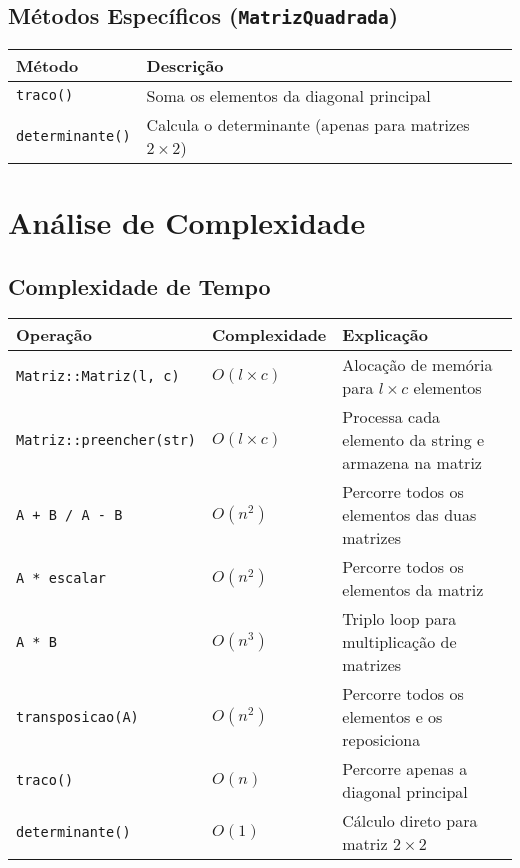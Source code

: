 \documentclass{article}
\begin{document}
\subsection{Métodos Específicos (\texttt{MatrizQuadrada})}
\begin{tabular}{|l|p{10cm}|}
\hline
\textbf{Método} & \textbf{Descrição} \\
\hline
\texttt{traco()} & Soma os elementos da diagonal principal \\
\hline
\texttt{determinante()} & Calcula o determinante (apenas para matrizes $2\times2$) \\
\hline
\end{tabular}

\section{Análise de Complexidade}

\subsection{Complexidade de Tempo}
\begin{tabular}{|l|l|p{8cm}|}
\hline
\textbf{Operação} & \textbf{Complexidade} & \textbf{Explicação} \\
\hline
\texttt{Matriz::Matriz(l, c)} & $O(l \times c)$ & Alocação de memória para $l \times c$ elementos \\
\hline
\texttt{Matriz::preencher(str)} & $O(l \times c)$ & Processa cada elemento da string e armazena na matriz \\
\hline
\texttt{A + B / A - B} & $O(n^2)$ & Percorre todos os elementos das duas matrizes \\
\hline
\texttt{A * escalar} & $O(n^2)$ & Percorre todos os elementos da matriz \\
\hline
\texttt{A * B} & $O(n^3)$ & Triplo loop para multiplicação de matrizes \\
\hline
\texttt{transposicao(A)} & $O(n^2)$ & Percorre todos os elementos e os reposiciona \\
\hline
\texttt{traco()} & $O(n)$ & Percorre apenas a diagonal principal \\
\hline
\texttt{determinante()} & $O(1)$ & Cálculo direto para matriz $2\times2$ \\
\hline
\end{tabular}
\end{document}
